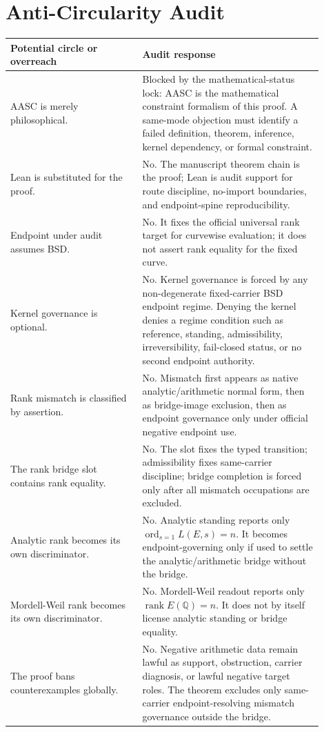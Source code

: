 \documentclass[11pt]{article}
\newcommand{\Q}{\mathbb{Q}}
\newcommand{\rank}{\operatorname{rank}}
\newcommand{\ord}{\operatorname{ord}}
\begin{document}
\section{Anti-Circularity Audit}
\begin{longtable}{L{0.38\linewidth}L{0.52\linewidth}}
\toprule
\textbf{Potential circle or overreach} & \textbf{Audit response}\\
\midrule
AASC is merely philosophical. & Blocked by the mathematical-status lock: AASC is the mathematical constraint formalism of this proof. A same-mode objection must identify a failed definition, theorem, inference, kernel dependency, or formal constraint.\\
Lean is substituted for the proof. & No. The manuscript theorem chain is the proof; Lean is audit support for route discipline, no-import boundaries, and endpoint-spine reproducibility.\\
Endpoint under audit assumes BSD. & No. It fixes the official universal rank target for curvewise evaluation; it does not assert rank equality for the fixed curve.\\
Kernel governance is optional. & No. Kernel governance is forced by any non-degenerate fixed-carrier BSD endpoint regime. Denying the kernel denies a regime condition such as reference, standing, admissibility, irreversibility, fail-closed status, or no second endpoint authority.\\
Rank mismatch is classified by assertion. & No. Mismatch first appears as native analytic/arithmetic normal form, then as bridge-image exclusion, then as endpoint governance only under official negative endpoint use.\\
The rank bridge slot contains rank equality. & No. The slot fixes the typed transition; admissibility fixes same-carrier discipline; bridge completion is forced only after all mismatch occupations are excluded.\\
Analytic rank becomes its own discriminator. & No. Analytic standing reports only $\ord_{s=1}L(E,s)=n$. It becomes endpoint-governing only if used to settle the analytic/arithmetic bridge without the bridge.\\
Mordell-Weil rank becomes its own discriminator. & No. Mordell-Weil readout reports only $\rank E(\Q)=n$. It does not by itself license analytic standing or bridge equality.\\
The proof bans counterexamples globally. & No. Negative arithmetic data remain lawful as support, obstruction, carrier diagnosis, or lawful negative target roles. The theorem excludes only same-carrier endpoint-resolving mismatch governance outside the bridge.\\

\end{longtable}
\end{document}
